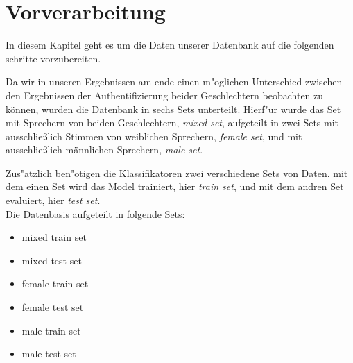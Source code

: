 \section{Vorverarbeitung}
\label{pre}

In diesem Kapitel geht es um die Daten unserer Datenbank auf die folgenden schritte vorzubereiten.

Da wir in unseren Ergebnissen am ende einen m"oglichen Unterschied zwischen den Ergebnissen der Authentifizierung beider Geschlechtern beobachten zu können, wurden die Datenbank in sechs Sets unterteilt.
Hierf"ur wurde das Set mit Sprechern von beiden Geschlechtern, \textit{mixed set}, aufgeteilt in zwei Sets mit ausschließlich Stimmen von weiblichen Sprechern, \textit{female set}, und mit ausschließlich männlichen Sprechern, \textit{male set}. 


Zus"atzlich ben"otigen die Klassifikatoren zwei verschiedene Sets von Daten.
mit dem einen Set wird das Model trainiert, hier \textit{train set}, und mit dem andren Set evaluiert, hier \textit{test set}. \\



Die Datenbasis aufgeteilt in folgende Sets:
\begin{itemize}
    \item[\textbullet] mixed train set
    \item[\textbullet] mixed test set
    \item[\textbullet] female train set
    \item[\textbullet] female test set
    \item[\textbullet] male train set
    \item[\textbullet] male test set
\end{itemize}
